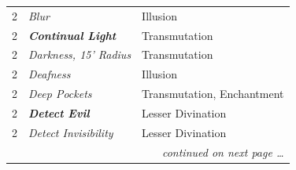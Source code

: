 \begin{multicols}{2}
\begin{minipage}{\columnwidth}
\begin{tabular}{|p{}|p{}|p{}|}
2	& \textit{Blur}	& Illusion \\
\rowcolor[gray]{.9}2	& \textbf{\textit{Continual Light}}	& Transmutation \\
2	& \textit{Darkness, 15' Radius}	& Transmutation \\
\rowcolor[gray]{.9}2	& \textit{Deafness}	& Illusion \\
2	& \textit{Deep Pockets}	& Transmutation, Enchantment \\
\rowcolor[gray]{.9}2	& \textbf{\textit{Detect Evil}}	& Lesser Divination \\
2	& \textit{Detect Invisibility}	& Lesser Divination \\
\hline
\multicolumn{3}{r}{\textit{continued on next page \ldots}} \\
\end{tabular}

\end{minipage}


\end{multicols}
